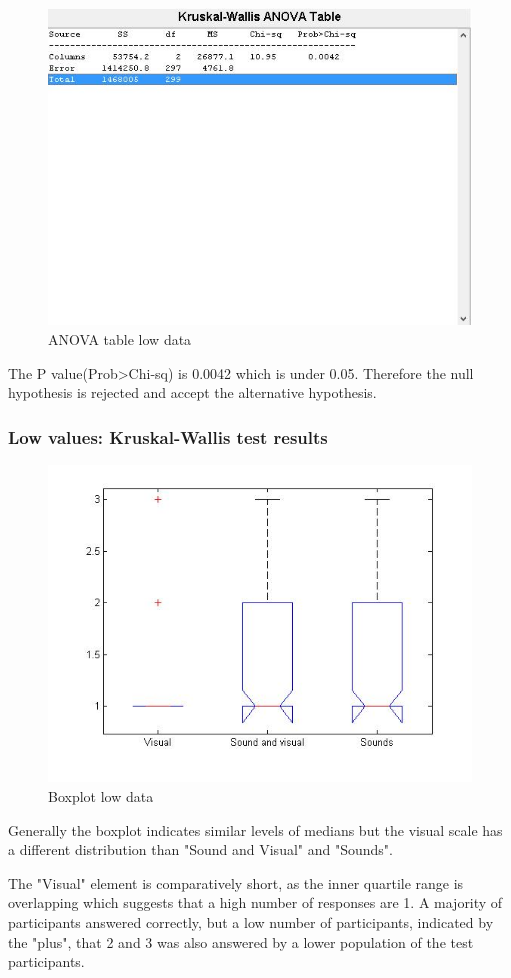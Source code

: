 \begin{figure}[!htbp]
    \centering
    \includegraphics[width=.7\textwidth]{images/Evaluation2.jpg}
    \caption{ANOVA table low data}
    \label{fig:evaluation2}
\end{figure}

The P value(Prob>Chi-sq) is 0.0042 which is under 0.05. Therefore the null hypothesis is rejected and accept the alternative hypothesis.


\subsubsection*{Low values: Kruskal-Wallis test results} %
\label{ssub:low_values_kruskal_wallis_test_results}

\begin{figure}[!htbp]
    \centering
    \includegraphics[width=.5\textwidth]{images/Evaluation3.jpg}
    \caption{Boxplot low data}
    \label{fig:evaluation3}
\end{figure}

Generally the boxplot indicates similar levels of medians but the visual scale has a different distribution than "Sound and Visual" and "Sounds".

The "Visual" element is comparatively short, as the inner quartile range is overlapping which suggests that a high number of responses are 1. 
A majority of participants answered correctly, but a low number of participants, indicated by the "plus", that 2 and 3 was also answered by a lower population of the test participants.

